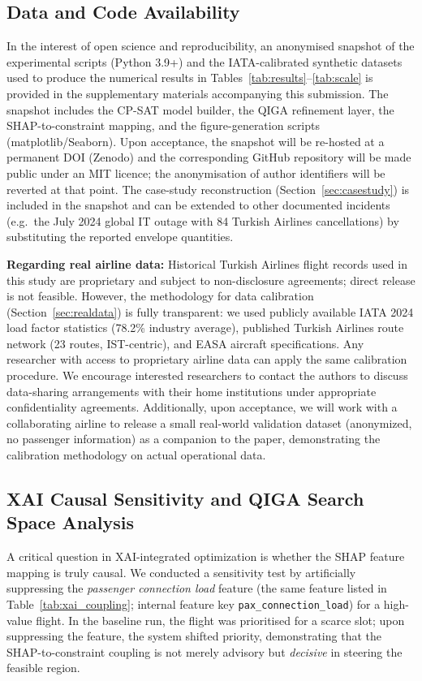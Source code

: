 \documentclass[12pt,number]{elsarticle}
\begin{document}
\subsection{Data and Code Availability}
\label{sec:reproducibility}

In the interest of open science and reproducibility, an anonymised snapshot of the experimental scripts (Python 3.9+) and the IATA-calibrated synthetic datasets used to produce the numerical results in Tables~\ref{tab:results}--\ref{tab:scale} is provided in the supplementary materials accompanying this submission. The snapshot includes the CP-SAT model builder, the QIGA refinement layer, the SHAP-to-constraint mapping, and the figure-generation scripts (matplotlib/Seaborn). Upon acceptance, the snapshot will be re-hosted at a permanent DOI (Zenodo) and the corresponding GitHub repository will be made public under an MIT licence; the anonymisation of author identifiers will be reverted at that point. The case-study reconstruction (Section~\ref{sec:casestudy}) is included in the snapshot and can be extended to other documented incidents (e.g.\ the July 2024 global IT outage with 84 Turkish Airlines cancellations) by substituting the reported envelope quantities.

\textbf{Regarding real airline data:} Historical Turkish Airlines flight records used in this study are proprietary and subject to non-disclosure agreements; direct release is not feasible. However, the methodology for data calibration (Section~\ref{sec:realdata}) is fully transparent: we used publicly available IATA 2024 load factor statistics (78.2\% industry average), published Turkish Airlines route network (23 routes, IST-centric), and EASA aircraft specifications. Any researcher with access to proprietary airline data can apply the same calibration procedure. We encourage interested researchers to contact the authors to discuss data-sharing arrangements with their home institutions under appropriate confidentiality agreements. Additionally, upon acceptance, we will work with a collaborating airline to release a small real-world validation dataset (anonymized, no passenger information) as a companion to the paper, demonstrating the calibration methodology on actual operational data.

\subsection{XAI Causal Sensitivity and QIGA Search Space Analysis}

A critical question in XAI-integrated optimization is whether the SHAP feature mapping is truly causal. We conducted a sensitivity test by artificially suppressing the \emph{passenger connection load} feature (the same feature listed in Table~\ref{tab:xai_coupling}; internal feature key \texttt{pax\_connection\_load}) for a high-value flight. In the baseline run, the flight was prioritised for a scarce slot; upon suppressing the feature, the system shifted priority, demonstrating that the SHAP-to-constraint coupling is not merely advisory but \emph{decisive} in steering the feasible region.
\end{document}
